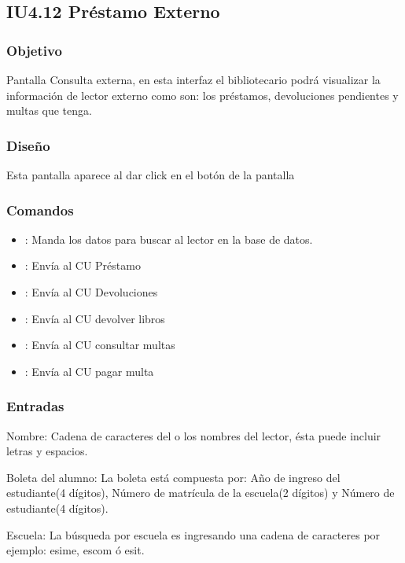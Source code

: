 \newpage
\subsection{IU4.12 Préstamo Externo}

\subsubsection{Objetivo}
	Pantalla Consulta externa, en esta interfaz el bibliotecario podrá visualizar la información de lector externo como son: los préstamos, devoluciones pendientes y multas que tenga.

\subsubsection{Diseño}
	Esta pantalla aparece al dar click en el botón  de la pantalla  



\subsubsection{Comandos}
	\begin{itemize}
		\item {}: Manda los datos para buscar al lector en la base de datos.
		\item {}: Envía al CU Préstamo
		\item {}: Envía al CU Devoluciones
		\item {}: Envía al CU devolver libros
		\item {}: Envía al CU consultar multas
		\item {}: Envía al CU pagar multa
	\end{itemize}	

\subsubsection{Entradas}
	\begin{Citemize}
		\item Nombre: Cadena de caracteres del o los nombres del lector, ésta puede incluir letras y espacios. 
		\item Boleta del alumno: La boleta está compuesta por: Año de ingreso del estudiante(4 dígitos), Número de matrícula de la escuela(2 dígitos) y Número de estudiante(4 dígitos).
		\item Escuela: La búsqueda por escuela es ingresando una cadena de caracteres por ejemplo: esime, escom ó esit.
	\end{Citemize}				